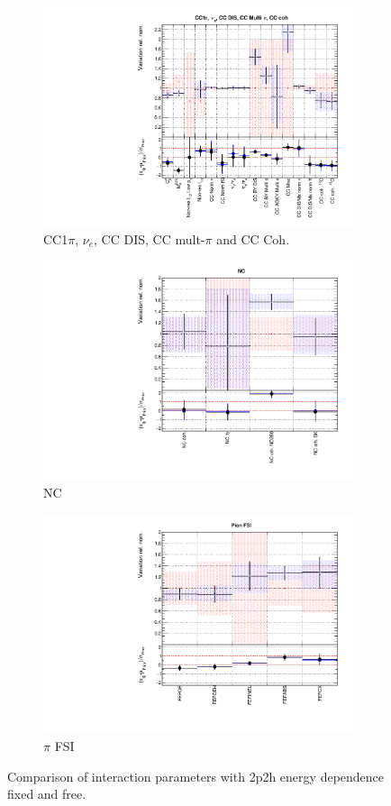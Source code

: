\begin{figure}
\begin{subfigure}{0.49\textwidth}
  \centering
  \includegraphics[width=0.9\linewidth]{figs/fixed2p2hfitsxsec3}
  \caption{CC1$\pi$, $\nu_e$, CC DIS, CC mult-$\pi$ and CC Coh.}
\end{subfigure}
\begin{subfigure}{0.49\textwidth}
  \centering
  \includegraphics[width=0.95\linewidth]{figs/fixed2p2hfitsxsec4}
  \caption{NC}
\end{subfigure}
\begin{subfigure}{0.49\textwidth}
  \centering
  \includegraphics[width=0.9\linewidth]{figs/fixed2p2hfitsxsec5}
  \caption{$\pi$ FSI}
\end{subfigure}
\caption{Comparison of interaction parameters with 2p2h energy dependence fixed and free.}
\label{fig:fixed2p2hxsec}
\end{figure}

